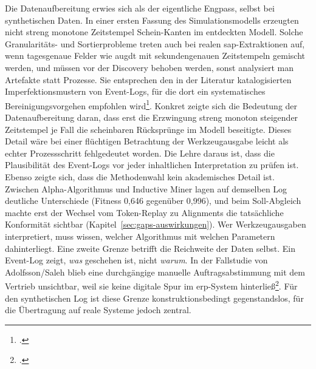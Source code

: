 Die Datenaufbereitung erwies sich als der eigentliche Engpass, selbst bei synthetischen Daten. In einer ersten Fassung des Simulationsmodells erzeugten nicht streng monotone Zeitstempel Schein-Kanten im entdeckten Modell. Solche Granularitäts- und Sortierprobleme treten auch bei realen \gls{sap}-Extraktionen auf, wenn tagesgenaue Felder wie \gls{augdt} mit sekundengenauen Zeitstempeln gemischt werden, und müssen vor der Discovery behoben werden, sonst analysiert man Artefakte statt Prozesse. Sie entsprechen den in der Literatur katalogisierten Imperfektionsmustern von Event-Logs, für die dort ein systematisches Bereinigungsvorgehen empfohlen wird\footcite[Vgl.][S.~132 ff.]{suriadi2017imperfection}. Konkret zeigte sich die Bedeutung der Datenaufbereitung daran, dass erst die Erzwingung streng monoton steigender Zeitstempel je Fall die scheinbaren Rücksprünge im Modell beseitigte. Dieses Detail wäre bei einer flüchtigen Betrachtung der Werkzeugausgabe leicht als echter Prozessschritt fehlgedeutet worden. Die Lehre daraus ist, dass die Plausibilität des Event-Logs vor jeder inhaltlichen Interpretation zu prüfen ist. Ebenso zeigte sich, dass die Methodenwahl kein akademisches Detail ist. Zwischen Alpha-Algorithmus und Inductive Miner lagen auf demselben Log deutliche Unterschiede (Fitness 0,646 gegenüber 0,996), und beim Soll-Abgleich machte erst der Wechsel vom Token-Replay zu Alignments die tatsächliche Konformität sichtbar (Kapitel~\ref{sec:gaps-auswirkungen}). Wer Werkzeugausgaben interpretiert, muss wissen, welcher Algorithmus mit welchen Parametern dahinterliegt. Eine zweite Grenze betrifft die Reichweite der Daten selbst. Ein Event-Log zeigt, \emph{was} geschehen ist, nicht \emph{warum}. In der Fallstudie von Adolfsson/Saleh blieb eine durchgängige manuelle Auftragsabstimmung mit dem Vertrieb unsichtbar, weil sie keine digitale Spur im \gls{erp}-System hinterließ\footcite[Vgl.][S.~50 und 62]{adolfsson2026o2c}. Für den synthetischen Log ist diese Grenze konstruktionsbedingt gegenstandslos, für die Übertragung auf reale Systeme jedoch zentral.

